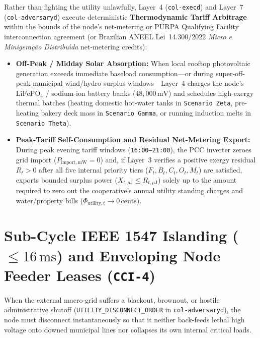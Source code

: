 Rather than fighting the utility unlawfully, Layer~4 (\texttt{col-execd}) and Layer~7 (\texttt{col-adversaryd}) execute deterministic \textbf{Thermodynamic Tariff Arbitrage} within the bounds of the node's net-metering or PURPA Qualifying Facility interconnection agreement (or Brazilian ANEEL Lei~14.300/2022 \textit{Micro e Minigera{\c{c}}{\~a}o Distribu{\'\i}da} net-metering credits):
\begin{itemize}
    \item \textbf{Off-Peak / Midday Solar Absorption:} When local rooftop photovoltaic generation exceeds immediate baseload consumption---or during super-off-peak municipal wind/hydro surplus windows---Layer~4 charges the node's $\mathrm{LiFePO_4}$ / sodium-ion battery banks ($48{,}000\,\mathrm{mV}$) and schedules high-exergy thermal batches (heating domestic hot-water tanks in \texttt{Scenario Zeta}, pre-heating bakery deck mass in \texttt{Scenario Gamma}, or running induction melts in \texttt{Scenario Theta}).
    \item \textbf{Peak-Tariff Self-Consumption and Residual Net-Metering Export:} During peak evening tariff windows (\texttt{16:00--21:00}), the PCC inverter zeroes grid import ($P_{\mathrm{import,mW}} = 0$) and, if Layer~3 verifies a positive exergy residual $R_t > 0$ after all five internal priority tiers ($F_t, B_t, C_t, O_t, M_t$) are satisfied, exports bounded surplus power ($X_{t,\mu\mathrm{J}} \le R_{t,\mu\mathrm{J}}$) solely up to the amount required to zero out the cooperative's annual utility standing charges and water/property bills ($\Phi_{\mathrm{utility},t} \to 0\,\text{cents}$).
\end{itemize}

\section{Sub-Cycle IEEE 1547 Islanding ($\le 16\,\mathrm{ms}$) and Enveloping Node Feeder Leases (\texttt{CCI-4})}
\label{sec:l7-subcycle-islanding}

When the external macro-grid suffers a blackout, brownout, or hostile administrative shutoff (\texttt{UTILITY\_DISCONNECT\_ORDER} in \texttt{col-adversaryd}), the node must disconnect instantaneously so that it neither back-feeds lethal high voltage onto downed municipal lines nor collapses its own internal critical loads.

